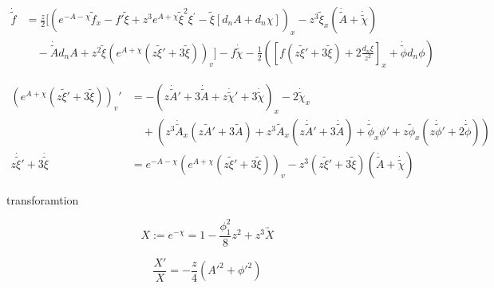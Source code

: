 \documentclass[12pt,a4paper]{ctexart}
\numberwithin{equation}{section}
\begin{document}
\begin{equation}
    \begin{aligned}
        \dot{\tilde{f}}&=\frac{z}{2}[(e^{-A-\chi}\tilde{f}_{x}-f'\tilde{\xi}+z^3e^{A+\chi}\tilde{\xi}^{2}\xi^{\prime}-\tilde{\xi}[d_{n}A+d_{n}\chi])_{x}-z^3\tilde{\xi}_x(\dot{\tilde{A}}+\dot{\tilde{\chi}})\\
        &\quad-\dot{\tilde{A}}d_{n}A+z^2\tilde{\xi}(e^{A+\chi}(z\tilde{\xi}'+3\tilde{\xi}))_{v}]-f\dot{\tilde{\chi}}-\frac{1}{2}([f(z\tilde{\xi}'+3\tilde{\xi})+2\frac{d_{n}\xi}{z^2}]_x+\dot{\tilde{\phi}}d_n\phi)
    \end{aligned}
\end{equation}

\begin{equation}
    \begin{aligned}
        (e^{A+\chi}(z\tilde{\xi}'+3\tilde{\xi}))_{v}'&=-(z\dot{\tilde{A}}'+3\dot{\tilde{A}}+z\dot{\tilde{\chi}}'+3\dot{\tilde{\chi}})_{x}-2\dot{\tilde{\chi}}_{x}\\
        &\quad+(z^3\dot{\tilde{A}}_{x}(z\tilde{A}'+3\tilde{A})+z^3\tilde{A}_{x}(z\dot{\tilde{A}}'+3\dot{\tilde{A}})+\dot{\tilde{\phi}}_{x}\phi'+z\tilde{\phi}_{x}(z\dot{\tilde{\phi}}'+2\dot{\tilde\phi}))\\
        z\dot{\tilde{\xi}}'+3\dot{\tilde{\xi}}&=e^{-A-\chi}(e^{A+\chi}(z\tilde{\xi}'+3\tilde{\xi}))_{v}-z^3(z\tilde{\xi}'+3\tilde{\xi})(\dot{\tilde{A}}+\dot{\tilde{\chi}})
    \end{aligned}
\end{equation}

transforamtion

\begin{equation}
    X:=e^{-\chi}=1-\frac{\phi_1^2}{8}z^2+z^3\tilde{X}
\end{equation}

\begin{equation}
    \frac{X'}{X}=-\frac{z}{4}(A'^2+\phi'^2)
\end{equation}
\end{document}
